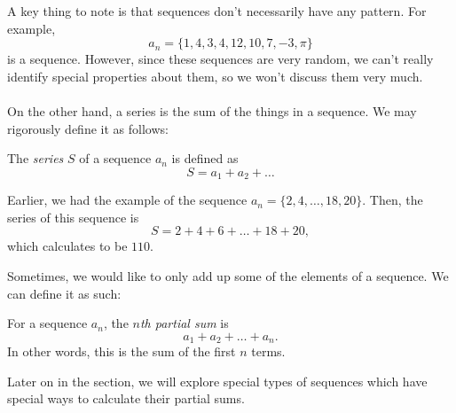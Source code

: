A key thing to note is that sequences don't necessarily have any pattern. For example,
\[a_n=\{1,4,3,4,12,10,7,-3,\pi\}\] 
is a sequence. However, since these sequences are very random, we can't really identify special properties about them, so we won't discuss them very much.
\\\\
On the other hand, a series is the sum of the things in a sequence. We may rigorously define it as follows:
\begin{definition}
    The \emph{series} $S$ of a sequence $a_n$ is defined as
    \[S=a_1+a_2+\dots\]
\end{definition}
\begin{example}
    Earlier, we had the example of the sequence $a_n=\{2,4,\dots,18,20\}$. Then, the series of this sequence is
    \[S=2+4+6+\dots+18+20,\]
    which calculates to be $110$.
\end{example}
Sometimes, we would like to only add up some of the elements of a sequence. We can define it as such:
\begin{definition}
    For a sequence $a_n$, the \emph{$n$th partial sum} is
    \[a_1+a_2+\dots+a_n.\]
    In other words, this is the sum of the first $n$ terms.
\end{definition}
Later on in the section, we will explore special types of sequences which have special ways to calculate their partial sums.

